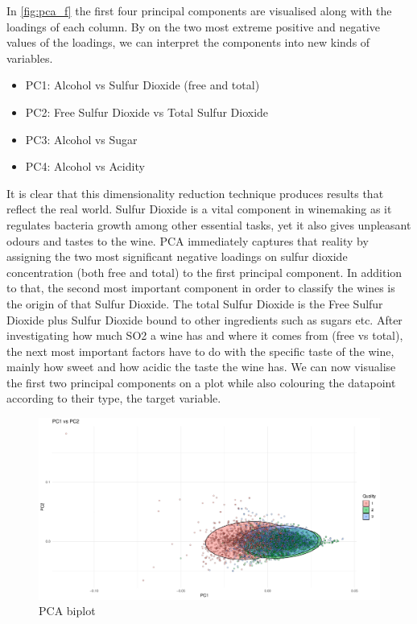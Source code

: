 \documentclass[11pt,twoside]{article}
\numberwithin{Theorem}{section}
\numberwithin{Definition}{section}
\numberwithin{Lemma}{section}
\numberwithin{Algorithm}{section}
\numberwithin{equation}{section}
\begin{document}
\label{fig:pca_f}
\vspace{2em}
In \autoref{fig:pca_f} the first four principal components are visualised along with the loadings of each column. By on the two most extreme positive and negative values of the loadings, we can interpret the components into new kinds of variables.
\begin{itemize}
\item PC1: Alcohol vs Sulfur Dioxide (free and total)
\item PC2: Free Sulfur Dioxide vs Total Sulfur Dioxide
\item PC3: Alcohol vs Sugar
\item PC4: Alcohol vs Acidity
\end{itemize}
It is clear that this dimensionality reduction technique produces results that reflect the real world. Sulfur Dioxide is a vital component in winemaking as it regulates bacteria growth among other essential tasks, yet it also gives unpleasant odours and tastes to the wine. PCA immediately captures that reality by assigning the two most significant negative loadings on sulfur dioxide concentration (both free and total) to the first principal component. In addition to that, the second most important component in order to classify the wines is the origin of that Sulfur Dioxide. The total Sulfur Dioxide is the Free Sulfur Dioxide plus Sulfur Dioxide bound to other ingredients such as sugars etc. After investigating how much SO2 a wine has and where it comes from (free vs total), the next most important factors have to do with the specific taste of the wine, mainly how sweet and how acidic the taste the wine has.
We can now visualise the first two principal components on a plot while also colouring the datapoint according to their \textsf{type}, the target variable.
\vspace*{1em}
\begin{figure}[!h]
\centering
\includegraphics[width=\textwidth]{./output/1.c.pca-biplot.pdf}
\caption{PCA biplot}
\label{fig:pca_biplot}
\end{figure}
\end{document}

